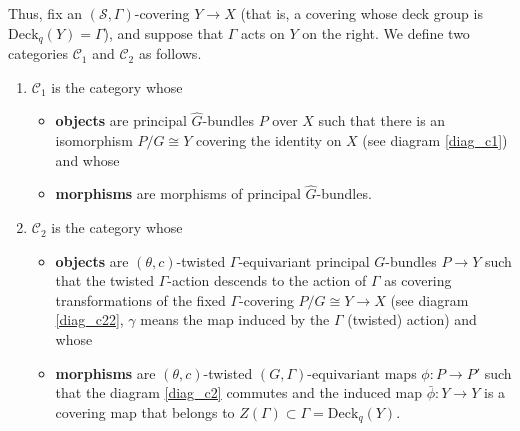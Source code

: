 Thus, fix an \((\mathcal{S},\Gamma)\)-covering \(Y \to X\) (that is, a covering whose deck group is \(\mathrm{Deck}_q(Y)=\Gamma\)), and suppose that \(\Gamma\) acts on \(Y\) on the right. We define two categories \(\mathcal{C}_1\) and \(\mathcal{C}_2\) as follows.
\begin{enumerate}
    \item \(\mathcal{C}_1\) is the category whose
    \begin{itemize}
        \item \textbf{objects} are principal \(\hat{G}\)-bundles \(P\) over \(X\) such that there is an isomorphism \(P/G\cong Y\) covering the identity on \(X\) (see diagram \ref{diag_c1}) and whose
        \item \textbf{morphisms} are morphisms of principal \(\hat{G}\)-bundles.
    \end{itemize}
    \item \(\mathcal{C}_2\) is the category whose
    \begin{itemize}
        \item \textbf{objects} are \((\theta, c)\)-twisted \(\Gamma\)-equivariant principal \(G\)-bundles \(P \to Y\) such that the twisted \(\Gamma\)-action descends to the action of \(\Gamma\) as covering transformations of the fixed \(\Gamma\)-covering \(P/G\cong Y\to X\) (see diagram \ref{diag_c22}, \(\gamma\) means the map induced by the \(\Gamma\) (twisted) action) and whose
        \item \textbf{morphisms} are \((\theta,c)\)-twisted \((G, \Gamma)\)-equivariant maps \(\phi\colon P \to P'\) such that the diagram \ref{diag_c2} commutes and the induced map \(\bar{\phi}\colon Y \to Y\) is a covering map that belongs to \(Z(\Gamma)\subset \Gamma=\mathrm{Deck}_q(Y)\).
    \end{itemize}
\end{enumerate}

